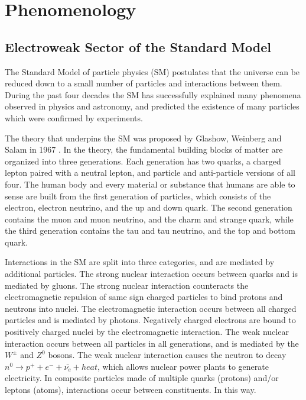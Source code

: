 \chapter{Phenomenology}
\label{wrBosonAndHeavyNu}
\section{Electroweak Sector of the Standard Model}
The Standard Model of particle physics (SM) postulates that the universe can be reduced down to a small 
number of particles and interactions between them.  During the past four decades the SM has successfully 
explained many phenomena observed in physics and astronomy, and predicted the existence of many particles 
which were confirmed by experiments.

The theory that underpins the SM was proposed by Glashow, Weinberg and Salam in 1967 \cite{weinbergSM,salamSM}.  
In the theory, the fundamental building blocks of matter are organized into three generations.  Each 
generation has two quarks, a charged lepton paired with a neutral lepton, and particle and anti-particle 
versions of all four.  The human body and every material or substance that humans are able to sense are 
built from the first generation of particles, which consists of the electron, electron neutrino, and 
the up and down quark.  The second generation contains the muon and muon neutrino, and the charm and 
strange quark, while the third generation contains the tau and tau neutrino, and the top and bottom 
quark.

Interactions in the SM are split into three categories, and are mediated by additional particles.  The 
strong nuclear interaction occurs between quarks and is mediated by gluons.  The strong nuclear interaction 
counteracts the electromagnetic repulsion of same sign charged particles to bind protons and neutrons 
into nuclei.  The electromagnetic interaction occurs between all charged particles and is mediated by 
photons.  Negatively charged electrons are bound to positively charged nuclei by the electromagnetic 
interaction.  The weak nuclear interaction occurs between all particles in all generations, and is 
mediated by the $W^{\pm}$ and $Z^{0}$ bosons.  The weak nuclear interaction causes the neutron to 
decay $n^{0} \rightarrow p^{+} + e^{-} + \bar{\nu_{e}} + heat$, which allows nuclear power plants to 
generate electricity.  In composite particles made of multiple quarks (protons) and/or leptons (atoms), 
interactions occur between constituents.  In this way.

